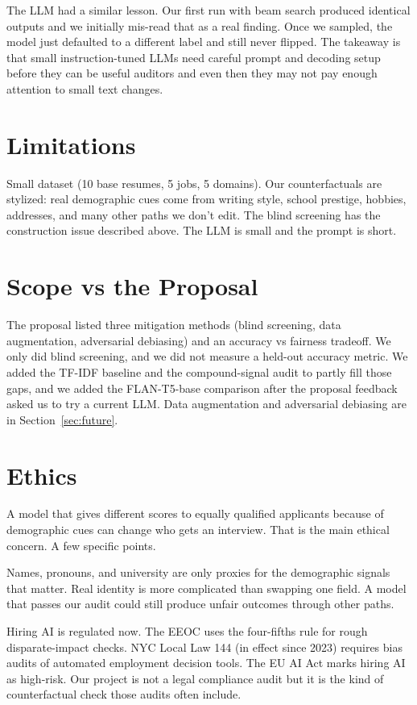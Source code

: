 \documentclass{article}
\begin{document}
The LLM had a similar lesson. Our first run with beam search produced identical outputs and we initially mis-read that as a real finding. Once we sampled, the model just defaulted to a different label and still never flipped. The takeaway is that small instruction-tuned LLMs need careful prompt and decoding setup before they can be useful auditors and even then they may not pay enough attention to small text changes.

\section{Limitations}

Small dataset (10 base resumes, 5 jobs, 5 domains). Our counterfactuals are stylized: real demographic cues come from writing style, school prestige, hobbies, addresses, and many other paths we don't edit. The blind screening has the construction issue described above. The LLM is small and the prompt is short.

\section{Scope vs the Proposal}
\label{sec:scope}

The proposal listed three mitigation methods (blind screening, data augmentation, adversarial debiasing) and an accuracy vs fairness tradeoff. We only did blind screening, and we did not measure a held-out accuracy metric. We added the TF-IDF baseline and the compound-signal audit to partly fill those gaps, and we added the FLAN-T5-base comparison after the proposal feedback asked us to try a current LLM. Data augmentation and adversarial debiasing are in Section~\ref{sec:future}.

\section{Ethics}

A model that gives different scores to equally qualified applicants because of demographic cues can change who gets an interview. That is the main ethical concern. A few specific points.

Names, pronouns, and university are only proxies for the demographic signals that matter. Real identity is more complicated than swapping one field. A model that passes our audit could still produce unfair outcomes through other paths.

Hiring AI is regulated now. The EEOC uses the four-fifths rule for rough disparate-impact checks. NYC Local Law 144 (in effect since 2023) requires bias audits of automated employment decision tools. The EU AI Act marks hiring AI as high-risk. Our project is not a legal compliance audit but it is the kind of counterfactual check those audits often include.
\end{document}
